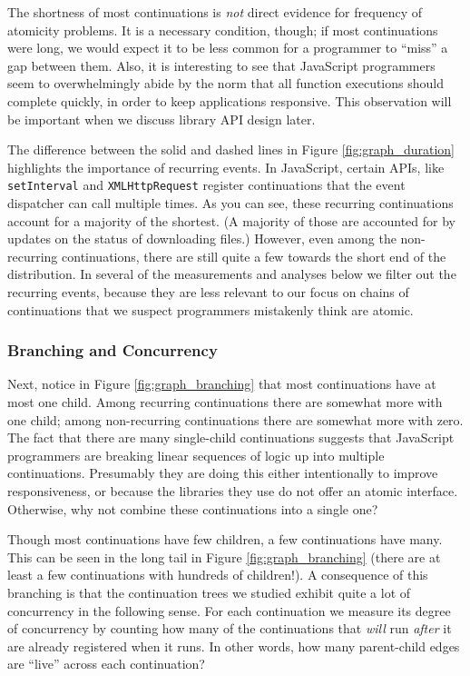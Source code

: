 \documentclass[acmsmall,anonymous,review]{acmart}\settopmatter{printfolios=true,printccs=false,printacmref=false}
\begin{document}
The shortness of most continuations is \emph{not} direct evidence for frequency of atomicity problems.
It is a necessary condition, though; if most continuations were long, we would expect it to be less common for a programmer to ``miss'' a gap between them.
Also, it is interesting to see that JavaScript programmers seem to overwhelmingly abide by the norm that all function executions should complete quickly, in order to keep applications responsive.
This observation will be important when we discuss library API design later.

The difference between the solid and dashed lines in Figure \ref{fig:graph_duration} highlights the importance of recurring events.
In JavaScript, certain APIs, like \texttt{setInterval} and \texttt{XMLHttpRequest} register continuations that the event dispatcher can call multiple times.
As you can see, these recurring continuations account for a majority of the shortest.
(A majority of those are accounted for by updates on the status of downloading files.)
However, even among the non-recurring continuations, there are still quite a few towards the short end of the distribution.
In several of the measurements and analyses below we filter out the recurring events, because they are less relevant to our focus on chains of continuations that we suspect programmers mistakenly think are atomic.

\subsubsection{Branching and Concurrency}

Next, notice in Figure \ref{fig:graph_branching} that most continuations have at most one child.
Among recurring continuations there are somewhat more with one child; among non-recurring continuations there are somewhat more with zero.
The fact that there are many single-child continuations suggests that JavaScript programmers are breaking linear sequences of logic up into multiple continuations.
Presumably they are doing this either intentionally to improve responsiveness, or because the libraries they use do not offer an atomic interface.
Otherwise, why not combine these continuations into a single one?

Though most continuations have few children, a few continuations have many.
This can be seen in the long tail in Figure \ref{fig:graph_branching} (there are at least a few continuations with hundreds of children!).
A consequence of this branching is that the continuation trees we studied exhibit quite a lot of concurrency in the following sense.
For each continuation we measure its degree of concurrency by counting how many of the continuations that \emph{will} run \emph{after} it are already registered when it runs.
In other words, how many parent-child edges are ``live'' across each continuation?
\end{document}
